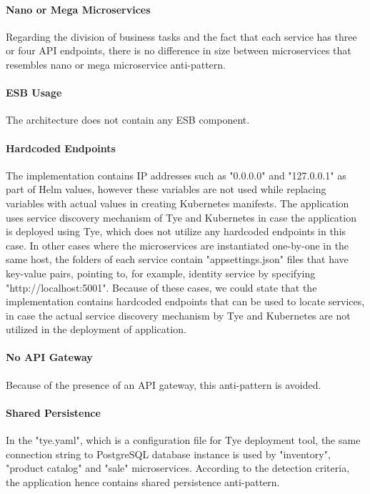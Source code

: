 \documentclass{Configuration_Files/PoliMi3i_thesis}
\begin{document}
\paragraph{Nano or Mega Microservices} Regarding the division of business tasks and the fact that each service has three or four API endpoints, there is no difference in size between microservices that resembles nano or mega microservice anti-pattern.

\paragraph{ESB Usage} The architecture does not contain any ESB component.

\paragraph{Hardcoded Endpoints} The implementation contains IP addresses such as "0.0.0.0" and "127.0.0.1" as part of Helm values, however these variables are not used while replacing variables with actual values in creating Kubernetes manifests.
The application uses service discovery mechanism of Tye and Kubernetes in case the application is deployed using Tye, which does not utilize any hardcoded endpoints in this case.
In other cases where the microservices are instantiated one-by-one in the same host, the folders of each service contain "appsettings.json" files that have key-value pairs, pointing to, for example, identity service by specifying "http://localhost:5001".
Because of these cases, we could state that the implementation contains hardcoded endpoints that can be used to locate services, in case the actual service discovery mechanism by Tye and Kubernetes are not utilized in the deployment of application.

\paragraph{No API Gateway} Because of the presence of an API gateway, this anti-pattern is avoided.

\paragraph{Shared Persistence} In the "tye.yaml", which is a configuration file for Tye deployment tool, the same connection string to PostgreSQL database instance is used by "inventory", "product catalog" and "sale" microservices.
According to the detection criteria, the application hence contains shared persistence anti-pattern.
\end{document}
